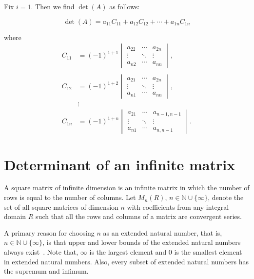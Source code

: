 Fix $i=1$. Then we find $\det(A)$ as follows:

\[
 \det(A) = a_{11} C_{11} + a_{12}C_{12} + \cdots + a_{1n}C_{1n}
\]

where
\[
\begin{aligned}
    C_{11} &= (-1)^{1+1} \begin{vmatrix} a_{22} & \cdots & a_{2n} \\ \vdots & \ddots & \vdots \\ a_{n2} & \cdots & a_{nn} \end{vmatrix}, \\\\
    C_{12} &= (-1)^{1+2} \begin{vmatrix} a_{21} & \cdots & a_{2n} \\ \vdots & \ddots & \vdots \\ a_{n1} & \cdots & a_{nn} \end{vmatrix},\\
    & \vdots \\
    C_{1n} &= (-1)^{1+n} \begin{vmatrix} a_{21} & \cdots & a_{n-1,n-1} \\ \vdots & \ddots & \vdots \\ a_{n1} & \cdots & a_{n,n-1} \end{vmatrix}.
\end{aligned}
\]




\vspace{30pt}
\section{Determinant of an infinite matrix}
A square matrix of infinite dimension is an infinite matrix in which the number of rows is equal to the number of columns. Let $M_n(R)$, $n\in \mathbb{N} \cup \{\infty\}$, denote the set of all square matrices of dimension $n$ with coefficients from any integral domain $R$ such that all the rows and columns of a matrix are convergent series.

A primary reason for choosing $n$ as an extended natural number, that is, $n\in\mathbb{N} \cup \{\infty\}$, is that upper and lower bounds of the extended natural numbers always exist~\cite{shivakumar1972diagonally}. Note that, $\infty$ is the largest element and $0$ is the smallest element in extended natural numbers. Also, every subset of extended natural numbers has the supremum and infimum. 


